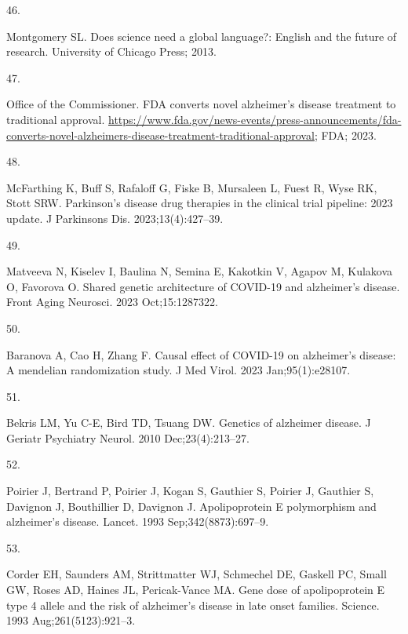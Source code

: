 \documentclass[
  a4paper,
]{article}
\newlength{\cslhangindent}
\newlength{\csllabelwidth}
\newlength{\cslentryspacingunit} %
\newenvironment{CSLReferences}[2] %
 {%
  \setlength{\parindent}{0pt}
  \ifodd #1
  \let\oldpar\par
  \def\par{\hangindent=\cslhangindent\oldpar}
  \fi
  \setlength{\parskip}{#2\cslentryspacingunit}
 }%
 {}
\newcommand{\CSLLeftMargin}[1]{\parbox[t]{\csllabelwidth}{#1}}
\newcommand{\CSLRightInline}[1]{\parbox[t]{\linewidth - \csllabelwidth}{#1}\break}
\begin{document}
\begin{CSLReferences}{0}{0}
\leavevmode{}%
\CSLLeftMargin{46. }%
\CSLRightInline{Montgomery SL. Does science need a global language?:
English and the future of research. University of Chicago Press; 2013. }

\leavevmode{}%
\CSLLeftMargin{47. }%
\CSLRightInline{Office of the Commissioner. {FDA} converts novel
alzheimer's disease treatment to traditional approval.
\url{https://www.fda.gov/news-events/press-announcements/fda-converts-novel-alzheimers-disease-treatment-traditional-approval};
FDA; 2023. }

\leavevmode{}%
\CSLLeftMargin{48. }%
\CSLRightInline{McFarthing K, Buff S, Rafaloff G, Fiske B, Mursaleen L,
Fuest R, Wyse RK, Stott SRW. Parkinson's disease drug therapies in the
clinical trial pipeline: 2023 update. J Parkinsons Dis.
2023;13(4):427--39. }

\leavevmode{}%
\CSLLeftMargin{49. }%
\CSLRightInline{Matveeva N, Kiselev I, Baulina N, Semina E, Kakotkin V,
Agapov M, Kulakova O, Favorova O. Shared genetic architecture of
{COVID-19} and alzheimer's disease. Front Aging Neurosci. 2023
Oct;15:1287322. }

\leavevmode{}%
\CSLLeftMargin{50. }%
\CSLRightInline{Baranova A, Cao H, Zhang F. Causal effect of {COVID-19}
on alzheimer's disease: A mendelian randomization study. J Med Virol.
2023 Jan;95(1):e28107. }

\leavevmode{}%
\CSLLeftMargin{51. }%
\CSLRightInline{Bekris LM, Yu C-E, Bird TD, Tsuang DW. Genetics of
alzheimer disease. J Geriatr Psychiatry Neurol. 2010 Dec;23(4):213--27.
}

\leavevmode{}%
\CSLLeftMargin{52. }%
\CSLRightInline{Poirier J, Bertrand P, Poirier J, Kogan S, Gauthier S,
Poirier J, Gauthier S, Davignon J, Bouthillier D, Davignon J.
Apolipoprotein {E} polymorphism and alzheimer's disease. Lancet. 1993
Sep;342(8873):697--9. }

\leavevmode{}%
\CSLLeftMargin{53. }%
\CSLRightInline{Corder EH, Saunders AM, Strittmatter WJ, Schmechel DE,
Gaskell PC, Small GW, Roses AD, Haines JL, Pericak-Vance MA. Gene dose
of apolipoprotein {E} type 4 allele and the risk of alzheimer's disease
in late onset families. Science. 1993 Aug;261(5123):921--3. }


\end{CSLReferences}
\end{document}
